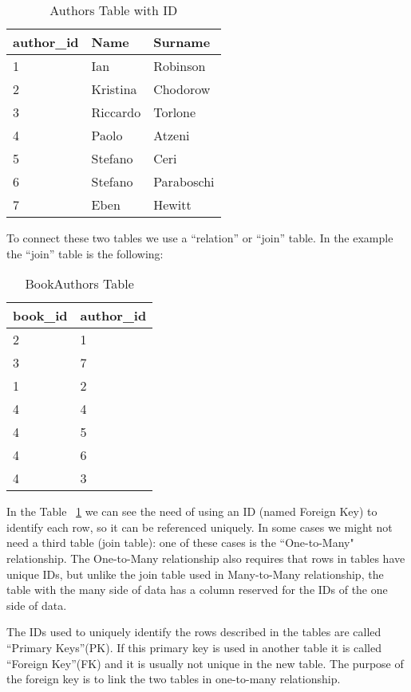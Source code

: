 \documentclass[a4page, 11pt]{article}
\begin{document}
\begin{table}[h]
	\centering
	\begin{tabular}{|l|l|l|}
		\hline
		
		\textbf{author\_id} & \textbf{Name} & \textbf{Surname}\\ 
		\hline
		1 & Ian & Robinson\\
		\hline
		2 & Kristina & Chodorow\\ 
		\hline
		3 & Riccardo & Torlone\\
		\hline
		4 & Paolo & Atzeni\\
		\hline
		5 & Stefano & Ceri\\
		\hline
		6 & Stefano & Paraboschi\\
		\hline
		7 & Eben & Hewitt\\
		\hline
		
	\end{tabular}
	\caption{Authors Table with ID}
\end{table}

To connect these two tables we use a ``relation'' or ``join'' table. In the example the ``join'' table is the following:
\pagebreak
\begin{table}[h]
	\centering
	\begin{tabular}{|l|l|}
		\hline
		
		\textbf{book\_id} & \textbf{author\_id} \\
		\hline
		2 & 1\\
		\hline
		3 & 7\\
		\hline
		1 & 2\\
		\hline
		4 & 4\\
		\hline
		4 & 5\\
		\hline
		4 & 6\\
		\hline
		4 & 3\\
		\hline
	\end{tabular}
	\caption{BookAuthors Table}
	\label{table:join}
\end{table}

In the Table ~\ref{table:join} we can see the need of using an ID (named Foreign Key) to identify each row, so it can be referenced uniquely. 
In some cases we might not need a third table (join table): one of these cases is the ``One-to-Many" relationship. 
The One-to-Many relationship also requires that rows in tables have unique IDs, but unlike the join table used in Many-to-Many relationship, the table with the many side of data has a column reserved for the IDs of the one side of data.

The IDs used to uniquely identify the rows described in the tables are called ``Primary Keys''(PK). 
If this primary key is used in another table it is called ``Foreign Key''(FK) and it is usually not unique in the new table. 
The purpose of the foreign key is to link the two tables in one-to-many relationship.
\end{document}
